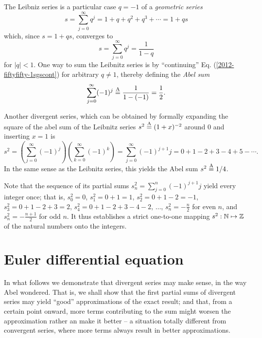 The Leibniz series is a particular case $q=-1$ of a {\em geometric series}
\begin{equation}
s = \sum_{j=0}^\infty q^j=1+q+q^2+q^3+ \cdots  =1+q s
\label{2009-fiftyfifty-1sgs}
\end{equation}
which, since $s=1+qs$, converges  to
\begin{equation}
s= \sum_{j=0}^\infty q^j= \frac{1}{1-q}
\label{2012-fiftyfifty-1sgscont}
\end{equation}
for $\vert q\vert <1$.
One way to sum the Leibnitz series is by ``continuing''
Eq. (\ref{2012-fiftyfifty-1sgscont})
for arbitrary $q\neq 1$, thereby defining the
{\em Abel sum}
\begin{equation}
\sum_{j=0}^\infty (-1)^j \stackrel{{\rm A}}{=} \frac{1}{1-(-1)} = \frac{1}{2}.
\label{2012-fiftyfifty-1sgscont1}
\end{equation}

Another divergent series,
which can be obtained by formally expanding  the square of the abel sum of the
Leibnitz series $s^2 \stackrel{{\rm A}}{=} (1+x)^{-2}$
around $0$ and inserting $x=1$
\cite{Kline-83}
is
\begin{equation}
s^2  =
\left(\sum_{j=0}^\infty (-1)^j\right)
\left(\sum_{k=0}^\infty (-1)^k\right)
= \sum_{j=0}^\infty (-1)^{j+1} j = 0 + 1-2+3-4+5-\cdots
.
\label{2009-fiftyfifty-1s1}
\end{equation}
In the same sense as the Leibnitz series, this yields the Abel sum $s^2\stackrel{{\rm A}}{=}1/4$.


Note that the sequence of its partial sums $s^2_n=\sum_{j=0}^n (-1)^{j+1} j $
yield every integer once; that is,
$s^2_0 =0$,
$s^2_1 =0+1=1$,
$s^2_2 =0+1-2=-1$,
$s^2_3 =0+1-2+3=2$,
$s^2_4 =0+1-2+3-4-2$,
$\ldots$,
$s^2_n =-\frac{n}{2}$ for even $n$,
and
$s^2_n =-\frac{n+1}{2}$ for odd $n$.
It thus establishes a strict one-to-one mapping
$s^2: {\Bbb N} \mapsto {\Bbb Z}$
of the natural numbers onto the integers.


\section{Euler differential equation}

In what follows we demonstrate that divergent series may make sense, in the way Abel
wondered.
That is, we shall show that the first partial sums of divergent series
may yield ``good'' approximations of the exact result; and
that, from a certain point onward, more terms contributing to the
sum  might worsen the approximation rather an make it better -- a situation totally different
from convergent series, where more terms always result in better approximations.

